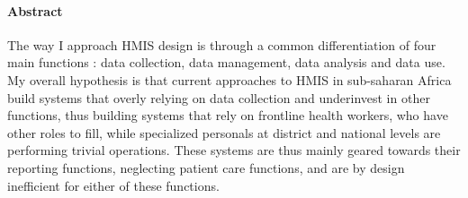 \documentclass[a4paper,11pt,final,twoside]{article}
\begin{document}
\newpage\null\thispagestyle{empty}\newpage








\thispagestyle{plain}
\setcounter{page}{1}



\paragraph{Abstract}

The way I approach HMIS design is through a common differentiation of four main functions : data collection, data management, data analysis and data use. My overall hypothesis is that current approaches to HMIS in sub-saharan Africa build systems that overly relying on data collection and underinvest in other functions, thus building systems that rely on frontline health workers, who have other roles to fill, while specialized personals at district and national levels are performing trivial operations. These systems are thus  mainly geared towards their reporting functions, neglecting patient care functions, and are by design inefficient for either of these functions. 
\end{document}

